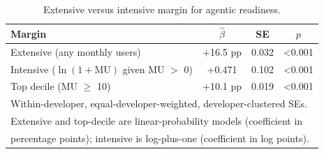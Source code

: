 \begin{table}[t]
  \centering
  \caption{Extensive versus intensive margin for agentic readiness.}
  \label{tab:eligibility_margins}
  \small
  \begin{tabular}{lccc}
    \toprule
    Margin & $\hat\beta$ & SE & $p$ \\
    \midrule
    Extensive (any monthly users) & +16.5 pp & 0.032 & <0.001 \\
    Intensive ($\ln(1+\text{MU})$ given MU $>$ 0) & +0.471 & 0.102 & <0.001 \\
    Top decile (MU $\geq$ 10) & +10.1 pp & 0.019 & <0.001 \\
    \bottomrule
    \multicolumn{4}{l}{\footnotesize Within-developer, equal-developer-weighted, developer-clustered SEs.} \\
    \multicolumn{4}{l}{\footnotesize Extensive and top-decile are linear-probability models (coefficient in} \\
    \multicolumn{4}{l}{\footnotesize percentage points); intensive is log-plus-one (coefficient in log points).}
  \end{tabular}
\end{table}